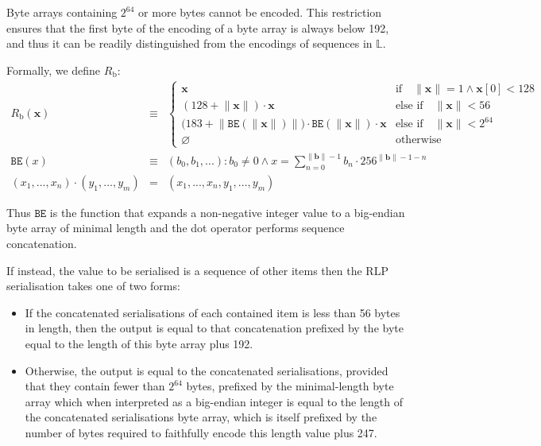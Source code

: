 \documentclass[9pt,oneside]{amsart}
\makeatletter
\newcommand{\linkdest}[1]{\Hy@raisedlink{\hypertarget{#1}{}}}
\makeatother
\begin{document}
Byte arrays containing $2^{64}$ or more bytes cannot be encoded. This restriction ensures that the first byte of the encoding of a byte array is always below 192, and thus it can be readily distinguished from the encodings of sequences in $\mathbb{L}$.

\hypertarget{RLP_serialisation_of_a_byte_array_R__b_math_def}{}Formally, we define $R_{\mathrm{b}}$:
\begin{eqnarray}
R_{\mathrm{b}}(\mathbf{x}) & \equiv & \begin{cases}
\mathbf{x} & \text{if} \quad \lVert \mathbf{x} \rVert = 1 \wedge \mathbf{x}[0] < 128 \\
(128 + \lVert \mathbf{x} \rVert) \cdot \mathbf{x} & \text{else if} \quad \lVert \mathbf{x} \rVert < 56 \\
\big(183 + \big\lVert \mathtt{BE}(\lVert \mathbf{x} \rVert) \big\rVert \big) \cdot \mathtt{BE}(\lVert \mathbf{x} \rVert) \cdot \mathbf{x} & \text{else if} \quad \lVert \mathbf{x} \rVert < 2^{64} \\
\varnothing & \text{otherwise}
\end{cases} \\
\label{eq:BE}
\mathtt{BE}(x) & \equiv & (b_0, b_1, ...): b_0 \neq 0 \wedge x = \sum_{n = 0}^{\lVert \mathbf{b} \rVert - 1} b_n \cdot 256^{\lVert \mathbf{b} \rVert - 1 - n} \\
(x_1, ..., x_n) \cdot (y_1, ..., y_m) & = & (x_1, ..., x_n, y_1, ..., y_m)
\end{eqnarray}

Thus $\mathtt{BE}$ is the function that expands a non-negative integer value to a big-endian byte array of minimal length and the dot operator performs sequence concatenation.

\hypertarget{RLP_serialisation_of_a_sequence_of_other_items_R__l_word_def}{}\linkdest{R__l}If instead, the value to be serialised is a sequence of other items then the RLP serialisation takes one of two forms:

\begin{itemize}
\item If the concatenated serialisations of each contained item is less than 56 bytes in length, then the output is equal to that concatenation prefixed by the byte equal to the length of this byte array plus 192.
\item Otherwise, the output is equal to the concatenated serialisations, provided that they contain fewer than $2^{64}$ bytes, prefixed by the minimal-length byte array which when interpreted as a big-endian integer is equal to the length of the concatenated serialisations byte array, which is itself prefixed by the number of bytes required to faithfully encode this length value plus 247.
\end{itemize}
\end{document}
